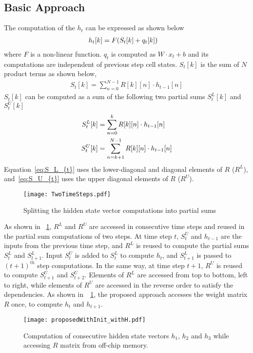 \subsection{Basic Approach}\label{sec:elementWiseApproach}
The computation of the $h_t$ can be expressed as shown below
\begin{align}\label{eq:h_{t}}
	h_{t}[k] &= F( S_{t}[k]+q_{t}[k])
\end{align}
where $F$ is a non-linear function. $q_{t}$ is computed as $W{\cdot}x_t{+}b$ and its computations are independent of previous step cell states. $S_{t}[k]$ is the sum of $N$ product terms as shown below,
\begin{align}
	S_{t}[k] = \sum_{n=0}^{N-1}R[k][n]\cdot h_{t-1}[n]
\end{align}
$S_{t}[k]$ can be computed as a sum of the following two partial sums $S_{t}^{L}[k]$ and $S_{t}^{U}[k]$
\begin{align}      
	S_{t}^{L}[k] &= \sum_{n=0}^{k}R[k][n]\cdot h_{t-1}[n] \label{eq:S_L_{t}}\\
	S_{t}^{U}[k] &= \sum_{n=k+1}^{N-1}R[k][n]\cdot h_{t-1}[n] \label{eq:S_U_{t}}
\end{align}
Equation~\eqref{eq:S_L_{t}} uses the lower-diagonal and diagonal elements of $R$ ($R^L$), and~\eqref{eq:S_U_{t}} uses the upper diagonal elements of $R$ ($R^U$). 
\begin{figure}[!tb]
	\centerline{\texttt{[image: TwoTimeSteps.pdf]}}
	\caption{Splitting the hidden state vector computations into partial sums}
	\label{fig:TwoTimeStepsComputation}
\end{figure}
As shown in \figurename{~\ref{fig:TwoTimeStepsComputation}}, $R^L$ and $R^U$ are accessed in consecutive time steps and reused in the partial sum computations of two steps. At time step $t$, $S_t^U$ and $h_{t-1}$ are the inputs from the previous time step, and $R^L$ is reused to compute the partial sums $S_{t}^{L}$ and $S_{t+1}^L$. Input $S_{t}^{U}$ is added to $S_{t}^{L}$ to compute $h_{t}$, and $S_{t+1}^L$ is passed to $(t{+}1)^{th}$ step computations.
In the same way, at time step $t{+}1$, $R^U$ is reused to compute $S_{t+1}^{U}$ and $S_{t+2}^{U}$. Elements of $R^L$ are accessed from top to bottom, left to right, while elements of $R^U$ are accessed in the reverse order to satisfy the dependencies. As shown in~\figurename{~\ref{fig:TwoTimeStepsComputation}}, the proposed approach accesses the weight matrix $R$ once, to compute $h_{t}$ and $h_{t+1}$. 
\begin{figure*}[htbp]
	\centerline{\texttt{[image: proposedWithInit\_withH.pdf]}}
	\caption{Computation of consecutive hidden state vectors $h_1$, $h_2$ and $h_3$ while accessing $R$ matrix from off-chip memory.}
	\label{fig:ExampleComputation}
\end{figure*}
